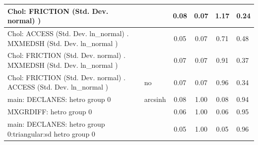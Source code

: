 \begin{table}
\begin{center}
\begin{tabular}{|l|l|c|c|c|l|}
			\hline
			 Chol: FRICTION (Std. Dev. normal) ) &  & 0.08 & 0.07 & 1.17 & 0.24 \\
			\hline
			 Chol: ACCESS (Std. Dev. ln_normal) . MXMEDSH (Std. Dev.   ln_normal ) &  & 0.05 & 0.07 & 0.71 & 0.48 \\
			\hline
			 Chol: FRICTION (Std. Dev. normal) . MXMEDSH (Std. Dev.   ln_normal ) &  & 0.07 & 0.07 & 0.91 & 0.37 \\
			\hline
			 Chol: FRICTION (Std. Dev. normal) . ACCESS (Std. Dev.   ln_normal ) & no & 0.07 & 0.07 & 0.96 & 0.34 \\
			\hline
			main: DECLANES: hetro group 0 & arcsinh & 0.08 & 1.00 & 0.08 & 0.94 \\
			\hline
			MXGRDIFF: hetro group 0 &  & 0.06 & 1.00 & 0.06 & 0.95 \\
			\hline
			main: DECLANES: hetro group 0:triangular:sd  hetro group 0 &  & 0.05 & 1.00 & 0.05 & 0.96 \\
			\hline
		\end{tabular}
	\end{center}
\end{table}